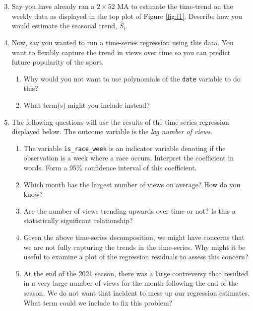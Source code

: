 \documentclass[12pt]{article}
\begin{document}
\begin{enumerate}
  \setcounter{enumi}{2}
  \bigskip
  \item Say you have already ran a $2 \times 52$ MA to estimate the time-trend on the weekly data as displayed in the top plot of Figure \ref{fig:f1}. 
  Describe how you would estimate the seasonal trend, $\hat{S}_t$.

  \bigskip
  \item Now, say you wanted to run a time-series regression using this data. 
  You want to flexibly capture the trend in views over time so you can predict future popularity of the sport.
  \begin{enumerate}[label=(\alph*)]
    \item Why would you not want to use polynomials of the \texttt{date} variable to do this?
    
    \item What term(s) might you include instead?
  \end{enumerate}

  \bigskip
  \item The following questions will use the results of the time series regression displayed below. 
  The outcome variable is the \emph{log number of views}.

  \begin{enumerate}[label=(\alph*)]
    \item The variable \texttt{is\_race\_week} is an indicator variable denoting if the observation is a week where a race occurs. 
    Interpret the coefficient in words.
    Form a 95\% confidence interval of this coefficient.
    
    \item Which month has the largest number of views on average? 
    How do you know?
    
    \item Are the number of views trending upwards over time or not? 
    Is this a statistically significant relationship?

    \item Given the above time-series decomposition, we might have concerns that we are not fully capturing the trends in the time-series. 
    Why might it be useful to examine a plot of the regression residuals to assess this concern?

    \item At the end of the 2021 season, there was a large contreversy that resulted in a very large number of views for the month following the end of the season. 
    We do not want that incident to mess up our regression estimates. 
    What term could we include to fix this problem?
  \end{enumerate}
\end{enumerate}
\end{document}
